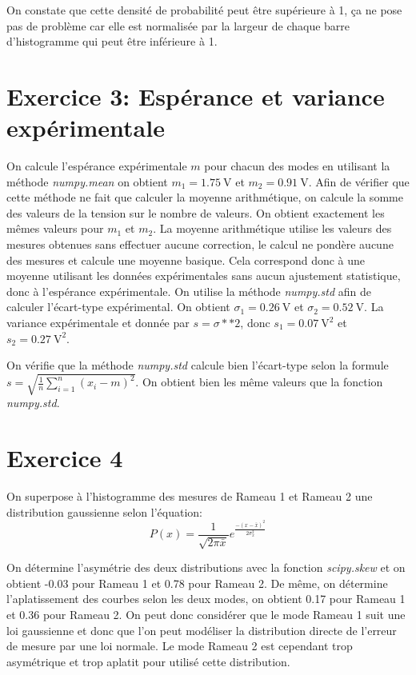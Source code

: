 \documentclass[a4paper, 11pt]{article}
\begin{document}
	On constate que cette densité de probabilité peut être supérieure à 1, ça ne pose pas de problème car elle est normalisée par la largeur de chaque barre d'histogramme qui peut être inférieure à 1.
	
	\section{Exercice 3: Espérance et variance expérimentale}
	
	On calcule l'espérance expérimentale $m$ pour chacun des modes en utilisant la méthode \textit{numpy.mean} on obtient $m_1 = 1.75 \ \mathrm{V}$ et $m_2 = 0.91 \ \mathrm{V}$.
	Afin de vérifier que cette méthode ne fait que calculer la moyenne arithmétique, on calcule la somme des valeurs de la tension sur le nombre de valeurs. On obtient exactement les mêmes valeurs pour $m_1$ et $m_2$.
	La moyenne arithmétique utilise les valeurs des mesures obtenues sans effectuer aucune correction, le calcul ne pondère aucune des mesures et calcule une moyenne basique. Cela correspond donc à une moyenne utilisant les données expérimentales sans aucun ajustement statistique, donc à l'espérance expérimentale.
	On utilise la méthode \textit{numpy.std} afin de calculer l'écart-type expérimental. On obtient $\sigma_1 = 0.26 \ \mathrm{V}$ et $\sigma_2 = 0.52 \ \mathrm{V}$. La variance expérimentale et donnée par $s = \sigma**2$, donc $s_1 = 0.07 \ \mathrm{V}^2$ et $s_2 = 0.27 \ \mathrm{V}^2$. 
	
	On vérifie que la méthode \textit{numpy.std} calcule bien l'écart-type selon la formule $s = \sqrt{\frac{1}{n}\sum_{i=1}^{n} (x_i - m)^2}$. On obtient bien les même valeurs que la fonction \textit{numpy.std}.
	
	\section{Exercice 4}
	
	On superpose à l'histogramme des mesures de Rameau 1 et Rameau 2 une distribution gaussienne selon l'équation: 
	$$P(x) = \frac{1}{\sqrt{2 \pi \bar{x}}} e^{\frac{-(x-\bar{x})^2}{2 \sigma_x^2}}$$
	
	On détermine l'asymétrie des deux distributions avec la fonction \textit{scipy.skew} et on obtient -0.03 pour Rameau 1 et 0.78 pour Rameau 2. De même, on détermine l'aplatissement des courbes selon les deux modes, on obtient 0.17 pour Rameau 1 et 0.36 pour Rameau 2.
	On peut donc considérer que le mode Rameau 1 suit une loi gaussienne et donc que l'on peut modéliser la distribution directe de l'erreur de mesure par une loi normale. Le mode Rameau 2 est cependant trop asymétrique et trop aplatit pour utilisé cette distribution.
	
\end{document}

